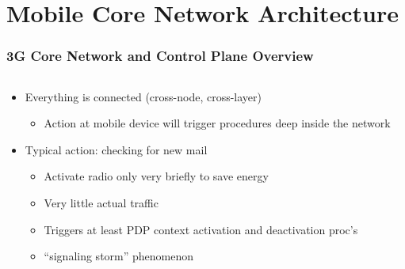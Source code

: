 \documentclass{beamer}
\begin{document}
\section{Mobile Core Network Architecture}

\begin{frame}
	\frametitle{3G Core Network and Control Plane Overview}


    \begin{columns}[T]
    	\begin{column}[T]{5cm}
			\begin{itemize}

				\item Everything is connected (cross-node, cross-layer)
					\begin{itemize}
						\item Action at mobile device will trigger procedures deep inside the network
					\end{itemize}
				\item Typical action: checking for new mail
					\begin{itemize}
						\item Activate radio only very briefly to save energy
						\item Very little actual traffic
						\item Triggers at least PDP context activation and deactivation proc's
						\item ``signaling storm'' phenomenon
					\end{itemize}

			\end{itemize}
		\end{column}


\end{columns}
\end{frame}
\end{document}
